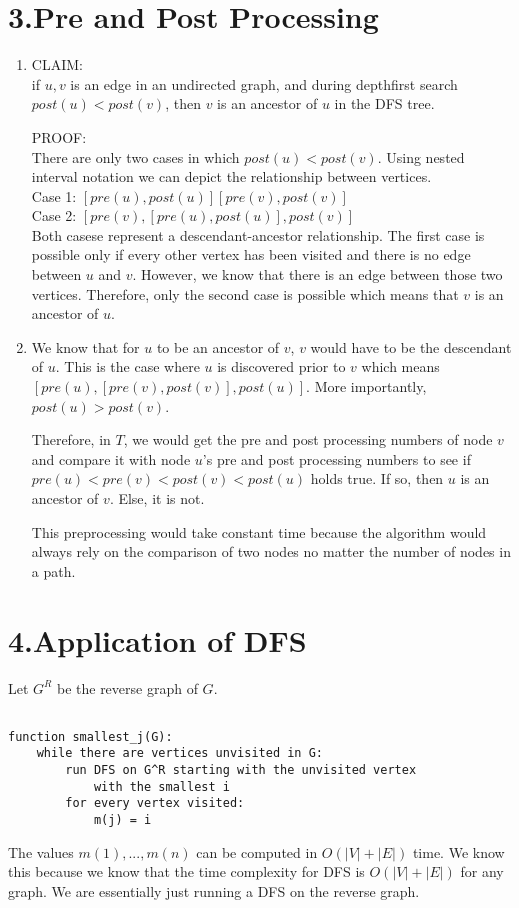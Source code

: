 \documentclass[11pt]{article}
\newenvironment{qparts}{\begin{enumerate}[{(}a{)}]}{\end{enumerate}}
\begin{document}
\section*{3.Pre and Post Processing}
\begin{qparts}

\item 
CLAIM: \\
if ${u, v}$ is an edge in an undirected graph, and during depthfirst search $post(u) < post(v)$, then $v$ is an ancestor of $u$ in the DFS tree.

PROOF: \\
There are only two cases in which $post(u) < post(v)$. Using nested interval notation we can depict the relationship between vertices.\\
Case 1: $[pre(u), post(u)][pre(v),post(v)]$ \\
Case 2: $[pre(v),[pre(u), post(u)], post(v)]$\\
Both casese represent a descendant-ancestor relationship. The first case is possible only if every other vertex has been visited and there is no edge between $u$ and $v$. However, we know that there is an edge between those two vertices. Therefore, only the second case is possible which means that $v$ is an ancestor of $u$.


\item 
We know that for $u$ to be an ancestor of $v$, $v$ would have to be the descendant of $u$. This is the case where $u$ is discovered prior to $v$ which means $[pre(u), [pre(v),post(v)], post(u)]$. More importantly, $post(u) > post(v)$.

Therefore, in $T$, we would get the pre and post processing numbers of node $v$ and compare it with node $u$'s pre and post processing numbers to see if $pre(u) < pre(v) < post(v) < post(u)$ holds true. If so, then $u$ is an ancestor of $v$. Else, it is not. 

This preprocessing would take constant time because the algorithm would always rely on the comparison of two nodes no matter the number of nodes in a path. 


\end{qparts}

\newpage
\section*{4.Application of DFS}

Let $G^R$ be the reverse graph of $G$.
\begin{lstlisting}

function smallest_j(G):
	while there are vertices unvisited in G:
		run DFS on G^R starting with the unvisited vertex 
			with the smallest i 
		for every vertex visited:
			m(j) = i
\end{lstlisting}
The values $m(1),..., m(n)$ can be computed in $O(|V|+|E|)$ time. We know this because we know that the time complexity for DFS is $O(|V|+|E|)$ for any graph. We are essentially just running a DFS on the reverse graph.  

\newpage
\end{document}
